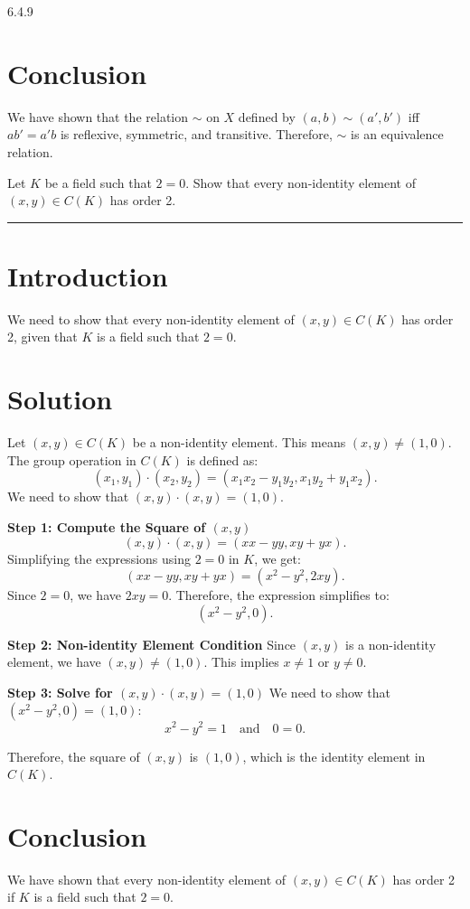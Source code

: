 \documentclass[12pt]{amsart}
\theoremstyle{definition}
\numberwithin{equation}{section}
\begin{document}
\begin{exercise}{6.4.9}
    \section*{Conclusion}
    We have shown that the relation \(\sim \) on \(X\) defined by \((a,b) \sim (a',b')\) iff \(ab' = a'b\) is reflexive, symmetric, and transitive. Therefore, \(\sim \) is an equivalence relation.

\end{exercise}
\newpage
\begin{exercise}{7} Let \(K \) be a field such that \(2=0\). Show that every non-identity element of \((x,y) \in C(K)\) has order 2.

    \noindent\rule{\linewidth}{1pt}

    \section*{Introduction}
    We need to show that every non-identity element of \((x,y) \in C(K)\) has order 2, given that \(K\) is a field such that \(2=0\).

    \section*{Solution}
    Let \((x,y) \in C(K)\) be a non-identity element. This means \((x,y) \neq (1,0)\). The group operation in \(C(K)\) is defined as:
    \[
    (x_1, y_1) \cdot (x_2, y_2) = (x_1 x_2 - y_1 y_2, x_1 y_2 + y_1 x_2).
    \]
    We need to show that \((x,y) \cdot (x,y) = (1,0)\).

    \noindent \textbf{Step 1: Compute the Square of \((x,y)\)}
    \[
    (x,y) \cdot (x,y) = (x x - y y, x y + y x).
    \]
    Simplifying the expressions using \(2 = 0\) in \(K\), we get:
    \[
    (x x - y y, x y + y x) = (x^2 - y^2, 2xy).
    \]
    Since \(2 = 0\), we have \(2xy = 0\). Therefore, the expression simplifies to:
    \[
    (x^2 - y^2, 0).
    \]

    \noindent \textbf{Step 2: Non-identity Element Condition}
    Since \((x,y)\) is a non-identity element, we have \((x,y) \neq (1,0)\). This implies \(x \neq 1\) or \(y \neq 0\).

    \noindent \textbf{Step 3: Solve for \((x,y) \cdot (x,y) = (1,0)\)}
    We need to show that \( (x^2 - y^2, 0) = (1,0) \):
    \[
    x^2 - y^2 = 1 \quad \text{and} \quad 0 = 0.
    \]

    Therefore, the square of \((x,y)\) is \((1,0)\), which is the identity element in \(C(K)\).

    \section*{Conclusion}
    We have shown that every non-identity element of \((x,y) \in C(K)\) has order 2 if \(K\) is a field such that \(2=0\).

\end{exercise}
\end{document}
